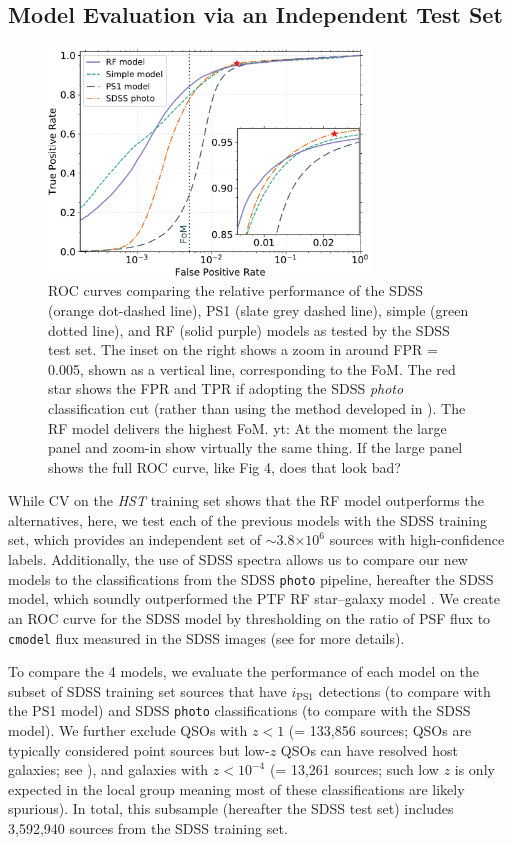 \documentclass[twocolumn, dvipdfmx]{aastex62}
\newcommand{\yutaro}[1]{{\color{red} yt: {#1}}}
\begin{document}
\subsection{Model Evaluation via an Independent Test Set}

\begin{figure}[t]
 \centering
  \includegraphics[width=3.35in]{./Figures/ROC_curves_log_inset2.pdf}
  \caption{ ROC curves comparing the relative performance of the SDSS
  (orange dot-dashed line), PS1 (slate grey dashed line), simple (green
  dotted line), and RF (solid purple) models as tested by the SDSS test set.
  The inset on the right shows a zoom in around FPR = 0.005, shown as a
  vertical line, corresponding to the FoM. The red star shows the FPR and
  TPR if adopting the SDSS \textit{photo} classification cut (rather than
  using the method developed in \citealt{Miller17}). The RF model delivers
  the highest FoM. \yutaro{At the moment the large panel and zoom-in show
  virtually the same thing. If the large panel shows the full ROC curve,
  like Fig 4, does that look bad?}}
  \label{fig:roc_sdss}
\end{figure}

While CV on the \textit{HST} training set shows that the RF model
outperforms the alternatives, here, we test each of the previous models with
the SDSS training set, which provides an independent set of $\sim$3.8$\times
10^6$ sources with high-confidence
labels. Additionally, the use of SDSS spectra allows us to compare our new
models to the classifications from the SDSS \texttt{photo} pipeline,
hereafter the SDSS model, which soundly outperformed the PTF RF star--galaxy
model \citep{Miller17}. We create an ROC curve for the SDSS model by
thresholding on the ratio of PSF flux to \texttt{cmodel} flux measured in the
SDSS images (see \citealt{Miller17} for more details).

To compare the 4 models, we evaluate the performance of each model on the
subset of SDSS training set sources that have $i_\mathrm{PS1}$ detections
(to compare with the PS1 model) and SDSS \texttt{photo} classifications (to
compare with the SDSS model). We further exclude QSOs with $z < 1$ (=
133,856 sources; QSOs are typically considered point sources but low-$z$
QSOs can have resolved host galaxies; see \citealt{Miller17}), and galaxies
with $z < 10^{-4}$ (= 13,261 sources; such low $z$ is only expected in the
local group meaning most of these classifications are likely spurious). In
total, this subsample (hereafter the SDSS test set) includes 3,592,940
sources from the SDSS training set.
\end{document}
